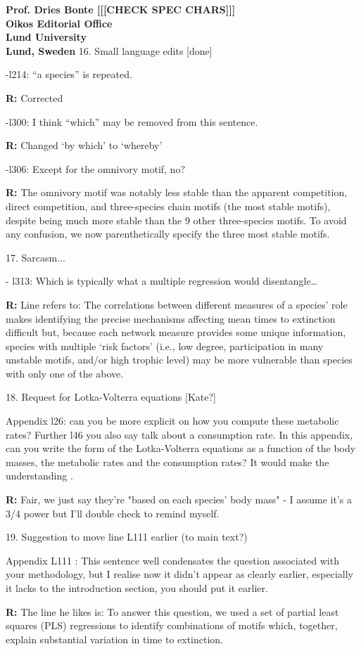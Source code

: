 \documentclass[12pt]{letter}
\begin{document}
\begin{letter}{\bf Prof. Dries Bonte [[[CHECK SPEC CHARS]]]\\
Oikos Editorial Office \\
Lund University \\
Lund, Sweden}
    16. Small language edits [done]

      -l214: “a species” is repeated.

        \textbf{R:} Corrected

      -l300: I think “which” may be removed from this sentence.

        \textbf{R:} Changed `by which' to `whereby'

      -l306: Except for the omnivory motif, no?

        \textbf{R:} The omnivory motif was notably less stable than the apparent competition, direct competition, and three-species chain motifs (the most stable motifs), despite being much more stable than the 9 other three-species motifs. To avoid any confusion, we now parenthetically specify the three most stable motifs.


    17. Sarcasm...

      - l313: Which is typically what a multiple regression would disentangle…

      \textbf{R:} Line refers to: 
              The correlations between different measures of a species' role makes identifying the precise mechanisms affecting mean times to extinction difficult but, because each network measure provides some unique information, species with multiple `risk factors' (i.e., low degree, participation in many unstable motifs, and/or high trophic level) may be more vulnerable than species with only one of the above.


    18. Request for Lotka-Volterra equations [Kate?]

      Appendix l26: can you be more explicit on how you compute these metabolic rates? Further l46 you also say talk about a consumption rate. In this appendix, can you write the form of the Lotka-Volterra equations as a function of the body masses, the metabolic rates and the consumption rates? It would make the understanding .

      \textbf{R:}
      Fair, we just say they're "based on each species' body mass" - I assume it's a 3/4 power but I'll double check to remind myself.


    19. Suggestion to move line L111 earlier (to main text?)

      Appendix L111 : This sentence well condensates the question associated with your methodology, but I realise now it didn’t appear as clearly earlier, especially it lacks to the introduction section, you should put it earlier.


      \textbf{R:} The line he likes is:   To answer this question, we used a set of partial least squares (PLS) regressions to identify combinations of motifs which, together, explain substantial variation in time to extinction. 



\end{letter}
\end{document}
